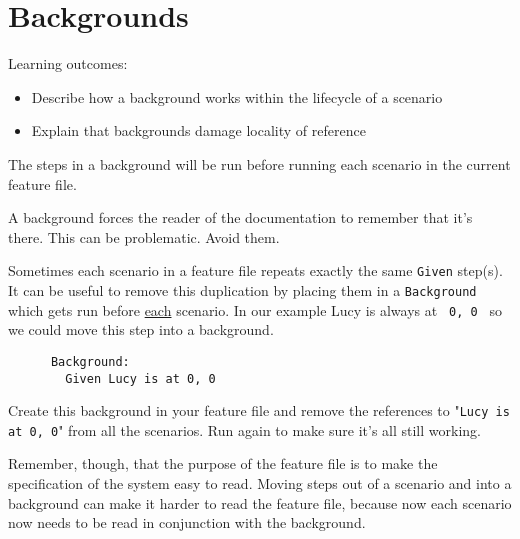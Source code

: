 \chapter*{Backgrounds}

\ifnotes

    Learning outcomes:
    
    \begin{itemize}
        \item Describe how a background works within the lifecycle of a scenario
        \item Explain that backgrounds damage locality of reference
    \end{itemize}

    The steps in a background will be run before running each scenario in the current feature file. 
    
    A background forces the reader of the documentation to remember that it's there. This can be problematic. Avoid them.
\fi 

\ifcontent 
    Sometimes each scenario in a feature file repeats exactly the same \texttt{Given} step(s). It can be useful to remove this duplication by placing them in a \texttt{Background} which gets run before \underline{each} scenario. In our example Lucy is always at \texttt{ 0, 0 } so we could move this step into a background.
    
    \begin{verbatim}
      Background:
        Given Lucy is at 0, 0
    \end{verbatim}
    
    Create this background in your feature file and remove the references to "\texttt{Lucy is at 0, 0}" from all the scenarios. Run \CUKE{} again to make sure it's all still working.
    
    Remember, though, that the purpose of the feature file is to make the specification of the system easy to read. Moving steps out of a scenario and into a background can make it harder to read the feature file, because now each scenario now needs to be read in conjunction with the background.
    
\fi